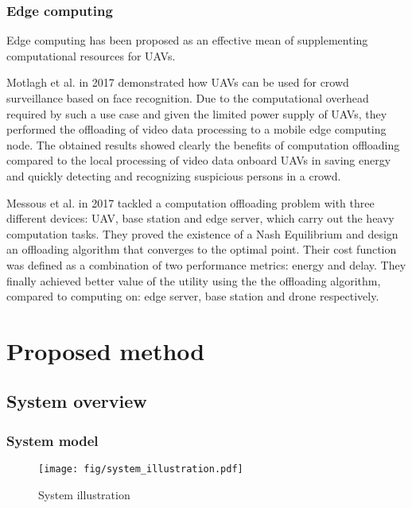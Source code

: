 \documentclass{ieeeaccess}
\begin{document}
\subsubsection{Edge computing}
Edge computing has been proposed as an effective mean of supplementing computational resources for UAVs\cite{Motlagh2017,Messous2017}.

Motlagh et al. in 2017 demonstrated how UAVs can be used for crowd surveillance based on face recognition. 
Due to the computational overhead required by such a use case and given the limited power supply of UAVs, they performed the offloading of video data processing to a mobile edge computing node.
The obtained results showed clearly the benefits of computation offloading compared to the local processing of video data onboard UAVs in saving energy and quickly detecting and recognizing suspicious persons in a crowd.

Messous et al. in 2017 tackled a computation offloading problem with three different devices: UAV, base station and edge server, which carry out the heavy computation tasks.
They proved the existence of a Nash Equilibrium and design an offloading algorithm that converges to the optimal point.
Their cost function was defined as a combination of two performance metrics: energy and delay.
They finally achieved better value of the utility using the the offloading algorithm, compared to computing on: edge server, base station and drone respectively.
%
%


\section{Proposed method}\label{method}

\subsection{System overview}\label{sys}
\subsubsection{System model}\label{sysmo}

\begin{figure}[htbp]
\begin{center}
\texttt{[image: fig/system\_illustration.pdf]}
\caption{System illustration}
\label{model}
\end{center}
\end{figure}
\end{document}
